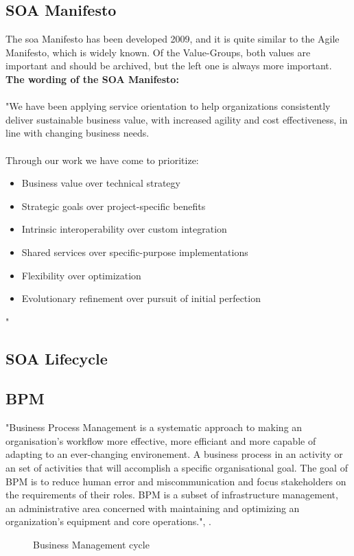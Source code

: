 \documentclass[12pt]{article}
\begin{document}
\subsection{SOA Manifesto }
The \gls{soa} Manifesto has been developed 2009, and it is quite similar to the Agile Manifesto, which is widely known. Of the Value-Groups, both values are important and should be archived, but the left one is always more important. \\
\textbf{The wording of the SOA Manifesto:}\\ \\
"We have been applying service orientation to help organizations 
consistently deliver sustainable business value, with increased agility
and cost effectiveness, in line with changing business needs. \\ \\
Through our work we have come to prioritize: \\
\begin{itemize}
\item Business value over technical strategy 
\item Strategic goals over project-specific benefits 
\item Intrinsic interoperability over custom integration 
\item Shared services over specific-purpose implementations 
\item Flexibility over optimization
\item Evolutionary refinement over pursuit of initial perfection
\end{itemize}" \cite{soamaifesto} 
\subsection{SOA Lifecycle}


\subsection{BPM}
"Business Process Management is a systematic approach to making an organisation's workflow more effective, more efficiant and more capable of adapting to an ever-changing environement. A business process in an activity or an set of activities that will accomplish a specific organisational goal. The goal of BPM is to reduce human error and miscommunication and focus stakeholders on the requirements of their roles. BPM is a subset of infrastructure management, an administrative area concerned with maintaining and optimizing an organization's equipment and core operations.", \cite{bpmdef}. 
\begin{figure}[here!]
	\centering
	\caption{Business Management cycle \cite{muede2}}
	\label{fig:anfang}
	\end{figure}
\end{document}

